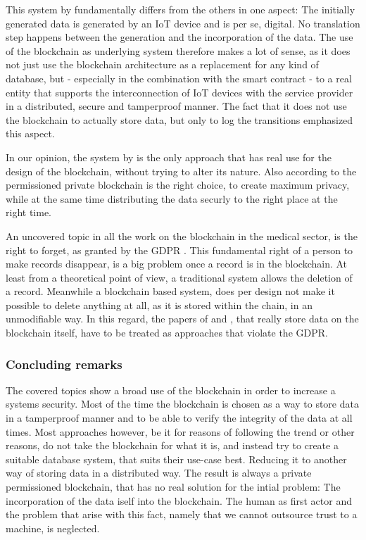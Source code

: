 This system by \cite{Baccarini2018} fundamentally differs from the others in one aspect: The initially generated data is generated by an IoT device and is per se, digital. No translation step happens between the generation and the incorporation of the data.
The use of the blockchain as underlying system therefore makes a lot of sense, as it does not just use the blockchain architecture as a replacement for any kind of database, but - especially in the combination with the smart contract - to a real entity that supports the interconnection of IoT devices with the service provider in a distributed, secure and tamperproof manner. The fact that it does not use the blockchain to actually store data, but only to log the transitions emphasized this aspect.

In our opinion, the system by \citeauthor{Baccarini2018} is the only approach that has real use for the design of the blockchain, without trying to alter its nature. Also according to \citeauthor{Wust2017} the permissioned private blockchain is the right choice, to create maximum privacy, while at the same time distributing the data securly to the right place at the right time.

An uncovered topic in all the work on the blockchain in the medical sector, is the right to forget, as granted by the GDPR \cite{EuropeanCommission2017}. This fundamental right of a person to make records disappear, is a big problem once a record is in the blockchain. At least from a theoretical point of view, a traditional system allows the deletion of a record. Meanwhile a blockchain based system, does per design not make it possible to delete anything at all, as it is stored within the chain, in an unmodifiable way. In this regard, the papers of \cite{Cao2019} and \cite{Azaria2016}, that really store data on the blockchain itself, have to be treated as approaches that violate the GDPR.

\subsubsection{Concluding remarks}
The covered topics show a broad use of the blockchain in order to increase a systems security. Most of the time the blockchain is chosen as a way to store data in a tamperproof manner and to be able to verify the integrity of the data at all times. 
Most approaches however, be it for reasons of following the trend or other reasons, do not take the blockchain for what it is, and instead try to create a suitable database system, that suits their use-case best. Reducing it to another way of storing data in a distributed way. The result is always a private permissioned blockchain, that has no real solution for the intial problem: The incorporation of the data iself into the blockchain. The human as first actor and the problem that arise with this fact, namely that we cannot outsource trust to a machine, is neglected.

